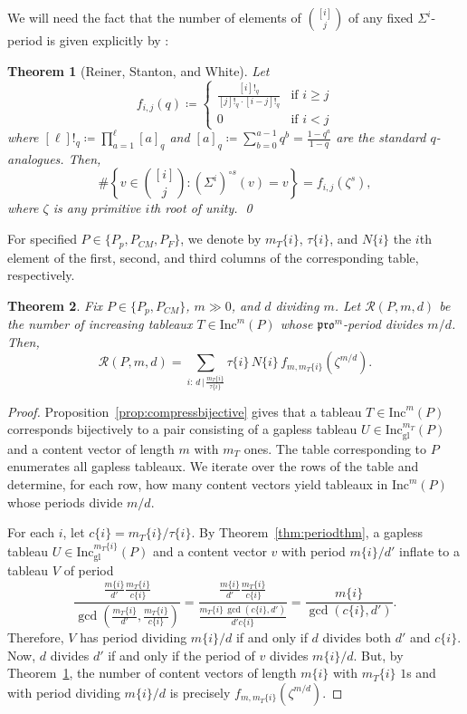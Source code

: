 \documentclass[12pt]{amsart}
\newtheorem{theorem}{Theorem}[section]
\theoremstyle{definition}
\theoremstyle{remark}
\numberwithin{equation}{section}
\newcommand{\inc}{\ensuremath{\mathrm{Inc}}}
\newcommand{\incgl}{\inc_{\mathrm{gl}}}
\newcommand{\pro}{\mathfrak{pro}}
\begin{document}
We will need the fact that the number of elements of $\binom{[i]}{j}$ of any fixed $\Sigma^i$-period is given explicitly by \cite[Theorem~1.1(b)]{Reiner.Stanton.White}:
\begin{theorem}[Reiner, Stanton, and White]\label{thm:rsw}
Let 
\begin{equation*}
f_{i,j}(q) \coloneqq 
\begin{cases}
 \frac{[i]!_q}{[j]!_q\cdot [i-j]!_q} & \text{if } i \geq j \\
 0 & \text{if } i < j 
\end{cases}
\end{equation*}
where $[\ell]!_q \coloneqq \prod_{a=1}^\ell [a]_q$ and $[a]_q \coloneqq \sum_{b = 0}^{a-1} q^b = \frac{1-q^{a}}{1-q}$ are the standard $q$-analogues. Then, 
\[\#\left\{ v \in \binom{[i]}{j} : (\Sigma^i)^{\circ s}(v) = v \right\} = f_{i,j}(\zeta^s),\] where $\zeta$ is any primitive $i$th root of unity. \qed
\end{theorem} 

For specified $P \in \{P_p, P_{CM}, P_F\}$, we denote by $m_T\{i\}$, $\tau\{i\}$, and $N\{i\}$ the $i$th element of the first, second, and third columns of the corresponding table, respectively. 

\begin{theorem}\label{thm:mainresult}
Fix $P \in \lbrace  P_p, P_{CM} \rbrace$, $m \gg 0$, and $d$ dividing $m$. Let $\mathcal{R}(P,m,d)$ be the number of increasing tableaux $T \in \inc^m(P)$ whose $\pro^m$-period divides $m/d$. Then,
\begin{equation}\label{eq:mainresulteq} 
\mathcal{R}(P,m,d)  = \sum \limits_{i: \, d \, \vert \, \frac{m_T\{i\}}{\tau\{i\}}} \tau\{i\} \, N\{i\} \, f_{m,m_T\{i\}}(\zeta^{m/d}).
\end{equation}
\end{theorem}
\begin{proof}
Proposition~\ref{prop:compressbijective} gives that a tableau $T \in \inc^m(P)$ corresponds bijectively to a pair consisting of a gapless tableau $U \in \incgl^{m_T}(P)$ and a content vector of length $m$ with $m_T$ ones. The table corresponding to $P$ enumerates all gapless tableaux. We iterate over the rows of the table and determine, for each row, how many content vectors yield tableaux in $\inc^m(P)$ whose periods divide $m/d$. 

For each $i$, let $c\{i\} = m_T\{i\}/\tau\{i\}$. By Theorem~\ref{thm:periodthm}, a gapless tableau $U \in \incgl^{m_T\{i\}}(P)$ and a content vector $v$ with period $m\{i\}/d'$ inflate to a tableau $V$ of period \[ \frac{\frac{m\{i\}}{d'} \frac{m_T\{i\}}{c\{i\}}}{\gcd(\frac{m_T\{i\}}{d'},\frac{m_T\{i\}}{c\{i\}})} = \frac{\frac{m\{i\}}{d'} \frac{m_T\{i\}}{c\{i\}}}{\frac{m_T\{i\} \, \gcd(c\{i\},d')}{d' c\{i\}}} = \frac{m\{i\}}{\gcd(c\{i\},d')}. \] 
Therefore, $V$ has period dividing $m\{i\}/d$ if and only if $d$ divides both $d'$ and $c\{i\}$. Now, $d$ divides $d'$ if and only if the period of $v$ divides $m\{i\}/d$. But, by Theorem~\ref{thm:rsw}, the number of content vectors of length $m\{i\}$ with $m_T\{i\}$ $1$s and with period dividing $m\{i\}/d$ is precisely $f_{m,m_T\{i\}}(\zeta^{m/d})$.
\end{proof}
\end{document}
